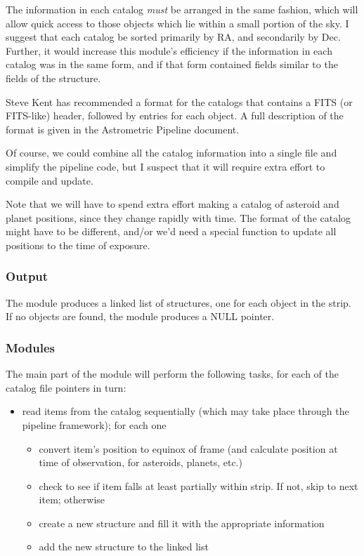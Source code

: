   The information in each catalog {\it must} be arranged
in the same fashion, which will allow quick access to those
objects which lie within a small portion of the sky.
I suggest that each catalog be sorted primarily by RA,
and secondarily by Dec.  Further, it would increase
this module's efficiency if the information in 
each catalog was in the same form, and if that form 
contained fields similar to the fields of the 
{\it \catobj} structure.

  Steve Kent has recommended a format for the catalogs that
contains a FITS (or FITS-like) header, followed by entries
for each object.  A full description of the format is
given in the Astrometric Pipeline document.  

  Of course, we could combine all the catalog information 
into a single file and simplify the pipeline code, but I
suspect that it will require extra effort to compile and
update.

  Note that we will have to spend extra effort making 
a catalog of asteroid and planet positions, since they change
rapidly with time.  The format of the catalog might have to be
different, and/or we'd need a special function to update
all positions to the time of exposure.

\subsubsection {Output}

  The module produces a linked list of {\it \catobj} structures,
one for each object in the strip.  If no objects are found,
the module produces a NULL pointer.

\subsubsection {Modules}

  The main part of the \kom module will perform the following
tasks, for each of the catalog file pointers in turn:

\begin{itemize}
  \item read items from the catalog sequentially (which may
        take place through the pipeline framework); for each one
  \begin{itemize}
     \item convert item's position to equinox of frame
           (and calculate position at time of observation, for
           asteroids, planets, etc.)
     \item check to see if item falls at least partially within
           strip.  If not, skip to next item; otherwise
     \item create a new {\it \catobj} structure and fill it with
           the appropriate information
     \item add the new structure to the linked list
  \end{itemize}
\end{itemize}

